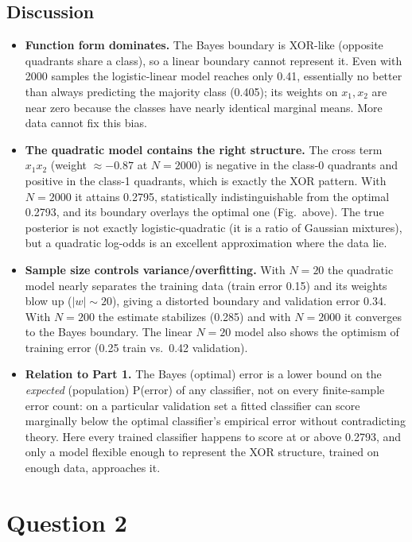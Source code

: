 \documentclass[11pt]{article}
\begin{document}
\subsection*{Discussion}
\begin{itemize}
\item \textbf{Function form dominates.} The Bayes boundary is XOR-like (opposite quadrants share a class), so a linear boundary cannot represent it. Even with 2000 samples the logistic-linear model reaches only 0.41, essentially no better than always predicting the majority class (0.405); its weights on $x_1,x_2$ are near zero because the classes have nearly identical marginal means. More data cannot fix this bias.
\item \textbf{The quadratic model contains the right structure.} The cross term $x_1x_2$ (weight $\approx-0.87$ at $N{=}2000$) is negative in the class-0 quadrants and positive in the class-1 quadrants, which is exactly the XOR pattern. With $N=2000$ it attains 0.2795, statistically indistinguishable from the optimal 0.2793, and its boundary overlays the optimal one (Fig.\ above). The true posterior is not exactly logistic-quadratic (it is a ratio of Gaussian mixtures), but a quadratic log-odds is an excellent approximation where the data lie.
\item \textbf{Sample size controls variance/overfitting.} With $N=20$ the quadratic model nearly separates the training data (train error 0.15) and its weights blow up ($|w|\sim 20$), giving a distorted boundary and validation error 0.34. With $N=200$ the estimate stabilizes (0.285) and with $N=2000$ it converges to the Bayes boundary. The linear $N=20$ model also shows the optimism of training error (0.25 train vs.\ 0.42 validation).
\item \textbf{Relation to Part 1.} The Bayes (optimal) error is a lower bound on the \emph{expected} (population) P(error) of any classifier, not on every finite-sample error count: on a particular validation set a fitted classifier can score marginally below the optimal classifier's empirical error without contradicting theory. Here every trained classifier happens to score at or above 0.2793, and only a model flexible enough to represent the XOR structure, trained on enough data, approaches it.
\end{itemize}

\section*{Question 2}
\end{document}
